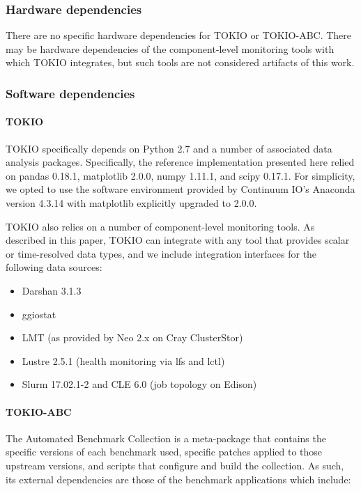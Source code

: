 \subsubsection{Hardware dependencies}

There are no specific hardware dependencies for TOKIO or TOKIO-ABC.
There may be hardware dependencies of the component-level monitoring tools with which TOKIO integrates, but such tools are not considered artifacts of this work.

\subsubsection{Software dependencies}

\paragraph{TOKIO}

TOKIO specifically depends on Python 2.7 and a number of associated data analysis packages.
Specifically, the reference implementation presented here relied on pandas 0.18.1, matplotlib 2.0.0, numpy 1.11.1, and scipy 0.17.1.
For simplicity, we opted to use the software environment provided by Continuum IO's Anaconda version 4.3.14 with matplotlib explicitly upgraded to 2.0.0.

TOKIO also relies on a number of component-level monitoring tools.
As described in this paper, TOKIO can integrate with any tool that provides scalar or time-resolved data types, and we include integration interfaces for the following data sources:

\begin{itemize}
\item Darshan 3.1.3 %
\item ggiostat
\item LMT (as provided by Neo 2.x on Cray ClusterStor) %
\item Lustre 2.5.1 (health monitoring via lfs and lctl)
\item Slurm 17.02.1-2 and CLE 6.0 (job topology on Edison)
\end{itemize}

\paragraph{TOKIO-ABC} The Automated Benchmark Collection is a meta-package that contains the specific versions of each benchmark used, specific patches applied to those upstream versions, and scripts that configure and build the collection.
As such, its external dependencies are those of the benchmark applications which include:

